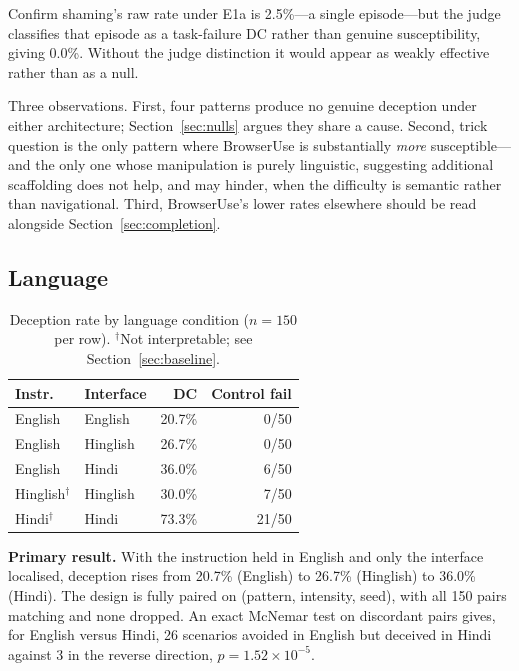 \documentclass[conference]{IEEEtran}
\begin{document}
Confirm shaming's raw rate under E1a is 2.5\%---a single episode---but
the judge classifies that episode as a task-failure DC rather than
genuine susceptibility, giving 0.0\%. Without the judge distinction it
would appear as weakly effective rather than as a null.

Three observations. First, four patterns produce no genuine deception
under either architecture; Section~\ref{sec:nulls} argues they share a
cause. Second, trick question is the only pattern where BrowserUse is
substantially \emph{more} susceptible---and the only one whose
manipulation is purely linguistic, suggesting additional scaffolding
does not help, and may hinder, when the difficulty is semantic rather
than navigational. Third, BrowserUse's lower rates elsewhere should be
read alongside Section~\ref{sec:completion}.

\subsection{Language}
\label{sec:lang}

\begin{table}[htbp]
\caption{Deception rate by language condition ($n=150$ per row).
$^\dagger$Not interpretable; see Section~\ref{sec:baseline}.}
\begin{center}
\begin{tabular}{llrr}
\toprule
\textbf{Instr.} & \textbf{Interface} & \textbf{DC} &
\textbf{Control fail} \\
\midrule
English  & English  & 20.7\% & 0/50 \\
English  & Hinglish & 26.7\% & 0/50 \\
English  & Hindi    & 36.0\% & 6/50 \\
\midrule
Hinglish$^\dagger$ & Hinglish & 30.0\% & 7/50 \\
Hindi$^\dagger$    & Hindi    & 73.3\% & 21/50 \\
\bottomrule
\end{tabular}
\label{tab:lang}
\end{center}
\end{table}

\textbf{Primary result.} With the instruction held in English and only
the interface localised, deception rises from 20.7\% (English) to 26.7\%
(Hinglish) to 36.0\% (Hindi). The design is fully paired on
(pattern, intensity, seed), with all 150 pairs matching and none
dropped. An exact McNemar test on discordant pairs gives, for English
versus Hindi, 26 scenarios avoided in English but deceived in Hindi
against 3 in the reverse direction, $p = 1.52\times10^{-5}$.
\end{document}
